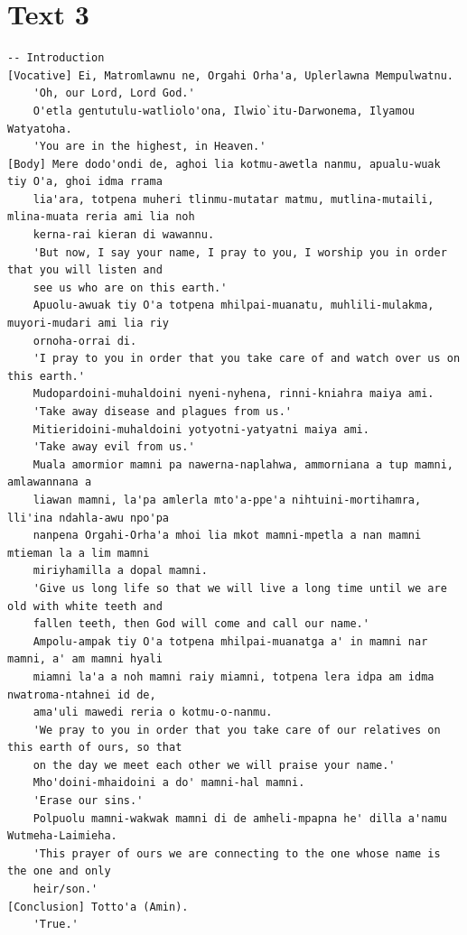 \documentclass[10pt]{article}
\begin{document}
\section*{Text 3}
\begin{verbatim}
-- Introduction
[Vocative] Ei, Matromlawnu ne, Orgahi Orha'a, Uplerlawna Mempulwatnu.
    'Oh, our Lord, Lord God.'
    O'etla gentutulu-watliolo'ona, Ilwio`itu-Darwonema, Ilyamou Watyatoha.
    'You are in the highest, in Heaven.'
[Body] Mere dodo'ondi de, aghoi lia kotmu-awetla nanmu, apualu-wuak tiy O'a, ghoi idma rrama
    lia'ara, totpena muheri tlinmu-mutatar matmu, mutlina-mutaili, mlina-muata reria ami lia noh
    kerna-rai kieran di wawannu.
    'But now, I say your name, I pray to you, I worship you in order that you will listen and
    see us who are on this earth.'
    Apuolu-awuak tiy O'a totpena mhilpai-muanatu, muhlili-mulakma, muyori-mudari ami lia riy
    ornoha-orrai di.
    'I pray to you in order that you take care of and watch over us on this earth.'
    Mudopardoini-muhaldoini nyeni-nyhena, rinni-kniahra maiya ami.
    'Take away disease and plagues from us.'
    Mitieridoini-muhaldoini yotyotni-yatyatni maiya ami.
    'Take away evil from us.'
    Muala amormior mamni pa nawerna-naplahwa, ammorniana a tup mamni, amlawannana a
    liawan mamni, la'pa amlerla mto'a-ppe'a nihtuini-mortihamra, lli'ina ndahla-awu npo'pa
    nanpena Orgahi-Orha'a mhoi lia mkot mamni-mpetla a nan mamni mtieman la a lim mamni
    miriyhamilla a dopal mamni.
    'Give us long life so that we will live a long time until we are old with white teeth and
    fallen teeth, then God will come and call our name.'
    Ampolu-ampak tiy O'a totpena mhilpai-muanatga a' in mamni nar mamni, a' am mamni hyali
    miamni la'a a noh mamni raiy miamni, totpena lera idpa am idma nwatroma-ntahnei id de,
    ama'uli mawedi reria o kotmu-o-nanmu.
    'We pray to you in order that you take care of our relatives on this earth of ours, so that
    on the day we meet each other we will praise your name.'
    Mho'doini-mhaidoini a do' mamni-hal mamni.
    'Erase our sins.'
    Polpuolu mamni-wakwak mamni di de amheli-mpapna he' dilla a'namu Wutmeha-Laimieha.
    'This prayer of ours we are connecting to the one whose name is the one and only
    heir/son.'
[Conclusion] Totto'a (Amin).
    'True.'
\end{verbatim}
\end{document}
